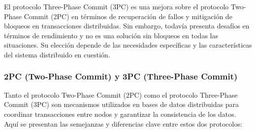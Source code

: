 \begin{tcolorbox}[colback=yellow!10!white, colframe=blue!50!black, title=Resumiendo, coltitle=white]
	El protocolo Three-Phase Commit (3PC) es una mejora sobre el protocolo Two-Phase Commit (2PC) en términos de recuperación de fallos y mitigación de bloqueos en transacciones distribuidas. Sin embargo, todavía presenta desafíos en términos de rendimiento y no es una solución sin bloqueos en todas las situaciones. Su elección depende de las necesidades específicas y las características del sistema distribuido en cuestión.
\end{tcolorbox}

\subsubsection{2PC (Two-Phase Commit) y 3PC (Three-Phase Commit)}
\noindent
Tanto el protocolo Two-Phase Commit (2PC) como el protocolo Three-Phase Commit (3PC) son mecanismos utilizados en bases de datos distribuidas para coordinar transacciones entre nodos y garantizar la consistencia de los datos. Aquí se presentan las semejanzas y diferencias clave entre estos dos protocolos:

